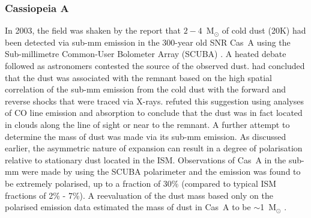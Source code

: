 \subsubsection{Cassiopeia A}

In 2003, the field was shaken by the report that $2-4$~M$_{\odot}$ of cold dust (20K) had been detected via sub-mm emission in the 300-year old SNR Cas~A using the Sub-millimetre Common-User Bolometer Array (SCUBA) \citep{Dunne2003}.   A heated debate followed as astronomers contested the source of the observed dust.  \citet{Dunne2003} had concluded that the dust was associated with the remnant based on the high spatial correlation of the sub-mm emission from the cold dust with the forward and reverse shocks that were traced via X-rays. \citet{Krause2004} refuted this suggestion using analyses of CO line emission and absorption to conclude that the dust was in fact located in clouds along the line of sight or near to the remnant.  A further attempt to determine the mass of dust was made via its sub-mm emission.  As discussed earlier, the asymmetric nature of expansion can result in a degree of polarisation relative to stationary dust located in the ISM.  Observations of Cas~A in the sub-mm were made by \citet{Dunne2009} using the SCUBA polarimeter and the emission was found to be extremely polarised, up to a fraction of 30\% (compared to typical ISM fractions of 2\% - 7\%).  A reevaluation of the dust mass based only on the polarised emission data estimated the mass of dust in Cas~A to be $\sim$1~M$_{\odot}$ \citep{Dunne2009}.

